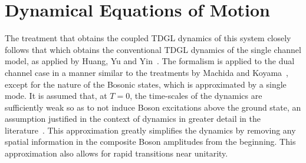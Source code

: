 \documentclass[a4paper,10pt]{article}
\begin{document}
\section{Dynamical Equations of Motion}
\label{sec:dyneqns}
The treatment that obtains the coupled TDGL dynamics of this system closely follows that which obtains the conventional TDGL dynamics of the single channel model, as applied by Huang, Yu and Yin~\cite{huang:bcsbecgp}. The formalism is applied to the dual channel case in a manner similar to the treatments by Machida and Koyama~\cite{machida:dynamics}, except for the nature of the Bosonic states, which is approximated by a single mode. It is assumed that, at $T=0$, the time-scales of the dynamics are sufficiently weak so as to not induce Boson excitations above the ground state, an assumption justified in the context of dynamics in greater detail in the literature~\cite{andreev:noneqmbcsbec}. This approximation greatly simplifies the dynamics by removing any spatial information in the composite Boson amplitudes from the beginning. This approximation also allows for rapid transitions near unitarity.
\end{document}
